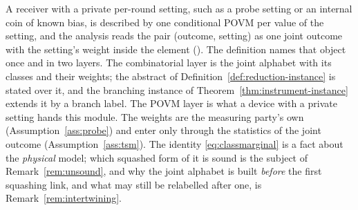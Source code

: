 
A receiver with a private per-round setting, such as a probe setting or an
internal coin of known bias, is described by one conditional POVM per value
of the setting, and the analysis reads the pair (outcome, setting) as one
joint outcome with the setting's weight inside the element
(). The
definition names that object once and in two layers. The combinatorial layer
is the joint alphabet with its classes and their weights; the abstract
 of Definition~\ref{def:reduction-instance} is stated over
it, and the branching instance of Theorem~\ref{thm:instrument-instance}
extends it by a branch label. The POVM layer is what a device with a private
setting hands this module. The weights are the measuring party's own
(Assumption~\ref{ass:probe}) and enter only through the statistics of the
joint outcome (Assumption~\ref{ass:tsm}). The identity
\eqref{eq:classmarginal} is a fact about the \emph{physical} model; which
squashed form of it is sound is the subject of Remark~\ref{rem:unsound}, and
why the joint alphabet is built \emph{before} the first squashing link, and
what may still be relabelled after one, is Remark~\ref{rem:intertwining}.

